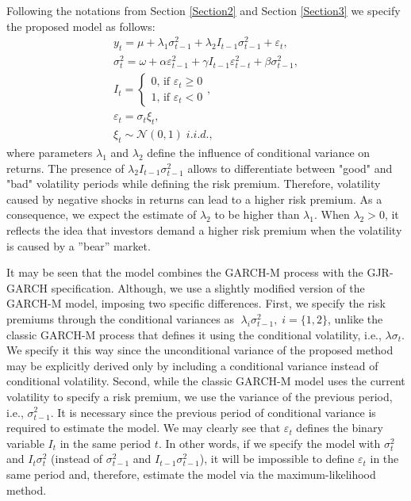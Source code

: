 \documentclass[authoryear, 1p]{elsarticle}
\numberwithin{equation}{section}
\begin{document}
Following the notations from Section \ref{Section2} and Section \ref{Section3} we specify the proposed model as follows:
\begin{equation}
\begin{gathered}
y_{t} = \mu + \lambda_{1} \sigma^2_{t-1} + \lambda_{2} I_{t-1} \sigma^2_{t-1} + \varepsilon_{t}, \\ 
\sigma^2_{t} = \omega + \alpha \varepsilon^2_{t-1} + \gamma I_{t-1} \varepsilon^2_{t-t} + \beta \sigma^2_{t-1}, \\ 
I_{t}=\begin{cases}0\text{, if }\varepsilon_{t}\geq 0 \\1\text{, if }\varepsilon_{t}< 0\end{cases},\\
\varepsilon_{t} = \sigma_{t} \xi_{t}, \\
\xi_{t} \sim \mathcal{N} \left(0,1\right) \; i.i.d., 
\end{gathered}
\end{equation}
where parameters $\lambda_{1}$ and $\lambda_{2}$ define the influence of conditional variance on returns. The presence of $\lambda_{2} I_{t-1} \sigma^2_{t-1}$ allows to differentiate between "good" and "bad" volatility periods while defining the risk premium. Therefore, volatility caused by negative shocks in returns can lead to a higher risk premium. As a consequence, we expect the estimate of $\lambda_{2}$ to be higher than $\lambda_{1}$. When $\lambda_{2}>0$, it reflects the idea that investors demand a higher risk premium when the volatility is caused by a ''bear'' market.

It may be seen that the model combines the GARCH-M process with the GJR-GARCH specification. Although, we use a slightly modified version of the GARCH-M model, imposing two specific differences.
First, we specify the risk premiums through the conditional variances as $\; \lambda_{i} \sigma^2_{t-1}, \; i = \{1, 2\}$, unlike the classic GARCH-M process that defines it using the conditional volatility, i.e., $\lambda \sigma_{t}$. We specify it this way since the unconditional variance of the proposed method may be explicitly derived only by including a conditional variance instead of conditional volatility. Second, while the classic GARCH-M model uses the current volatility to specify a risk premium, we use the variance of the previous period, i.e., $\sigma^2_{t-1}$. It is necessary since the previous period of conditional variance is required to estimate the model. We may clearly see that $\varepsilon_{t}$ defines the binary variable $I_{t}$ in the same period $t$. In other words, if we specify the model with $\sigma^2_{t}$ and $I_{t}\sigma^2_{t}$ (instead of $\sigma^2_{t-1}$ and $I_{t-1}\sigma^2_{t-1}$), it will be impossible to define $\varepsilon_{t}$ in the same period and, therefore, estimate the model via the maximum-likelihood method.
\end{document}

